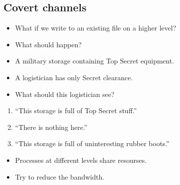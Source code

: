 \subsection{Covert channels}

\begin{frame}
  \begin{question}
    \begin{itemize}
      \item What if we write to an existing file on a higher level?
      \item What should happen?
    \end{itemize}
  \end{question}
\end{frame}

\begin{frame}
  \begin{example}
    \begin{itemize}
      \item A military storage containing Top Secret equipment.
      \item A logistician has only Secret clearance.
      \item What should this logistician see?
    \end{itemize}
  \end{example}

  \pause

  \begin{remark}[Alternatives]
    \begin{enumerate}
      \item \enquote{This storage is full of Top Secret stuff.}

        \pause

      \item \enquote{There is nothing here.}

        \pause

      \item \enquote{This storage is full of uninteresting rubber boots.}
    \end{enumerate}
  \end{remark}
\end{frame}

\begin{frame}
  \begin{remark}
    \begin{itemize}
      \item Processes at different levels share resourses.
    \end{itemize}
  \end{remark}

  \pause

  \begin{solution}
    \begin{itemize}
      \item Try to reduce the bandwidth.
    \end{itemize}
  \end{solution}
\end{frame}

